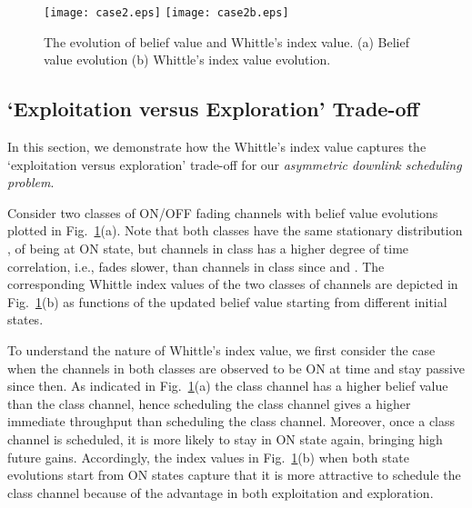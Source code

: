 \documentclass[11pt,twocolumn]{IEEEtran}
\begin{document}
\begin{figure}
\centering
\texttt{[image: case2.eps]}
\texttt{[image: case2b.eps]}
\vspace{-3pt} \caption{The evolution of belief value and Whittle's
index value. (a)
Belief value evolution (b) Whittle's index value evolution. }
\vspace{-15pt}
\label{fig:beliefindex}
\end{figure}







\subsection{`Exploitation versus Exploration' Trade-off}
\label{sec:num:trade-off}

\vspace{-3pt}In this section, we demonstrate how the Whittle's index value captures
the `exploitation versus exploration' trade-off for our \emph{asymmetric
downlink scheduling problem}.

Consider two classes of ON/OFF fading channels with belief value
evolutions plotted in Fig.~\ref{fig:beliefindex}(a). Note that
both classes have the same stationary distribution ,
 of being at ON state, but channels in class  has a higher
degree of time correlation, i.e., fades slower, than channels in
class  since  and . The corresponding Whittle
index values of the two classes of channels are depicted in
Fig.~\ref{fig:beliefindex}(b) as functions of the updated belief
value starting from different initial states.

To understand the nature of Whittle's index value, we first consider
the case when the channels in both classes are observed to be ON at
time  and stay passive since then. As indicated in
Fig.~\ref{fig:beliefindex}(a) the class  channel has a higher
belief value than the class  channel, hence scheduling the
class  channel gives a higher immediate throughput than
scheduling the class  channel. Moreover, once a class  channel
is scheduled, it is more likely to stay in ON state again,
bringing high future gains. Accordingly, the index values in
Fig.~\ref{fig:beliefindex}(b) when both state evolutions start from
ON states capture that it is more attractive to schedule the
class  channel because of the advantage in both exploitation and
exploration.
\end{document}
